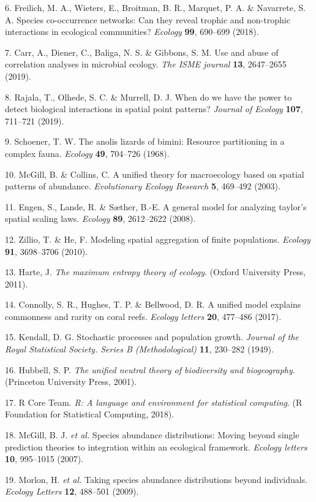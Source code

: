 \documentclass[]{article}
\begin{document}
\hypertarget{ref-freilich2018}{}
6. Freilich, M. A., Wieters, E., Broitman, B. R., Marquet, P. A. \&
Navarrete, S. A. Species co-occurrence networks: Can they reveal trophic
and non-trophic interactions in ecological communities? \emph{Ecology}
\textbf{99}, 690--699 (2018).

\hypertarget{ref-carr2019}{}
7. Carr, A., Diener, C., Baliga, N. S. \& Gibbons, S. M. Use and abuse
of correlation analyses in microbial ecology. \emph{The ISME journal}
\textbf{13}, 2647--2655 (2019).

\hypertarget{ref-rajala2019}{}
8. Rajala, T., Olhede, S. C. \& Murrell, D. J. When do we have the power
to detect biological interactions in spatial point patterns?
\emph{Journal of Ecology} \textbf{107}, 711--721 (2019).

\hypertarget{ref-schoener1968}{}
9. Schoener, T. W. The anolis lizards of bimini: Resource partitioning
in a complex fauna. \emph{Ecology} \textbf{49}, 704--726 (1968).

\hypertarget{ref-mcgill2003}{}
10. McGill, B. \& Collins, C. A unified theory for macroecology based on
spatial patterns of abundance. \emph{Evolutionary Ecology Research}
\textbf{5}, 469--492 (2003).

\hypertarget{ref-engen2008}{}
11. Engen, S., Lande, R. \& Sæther, B.-E. A general model for analyzing
taylor's spatial scaling laws. \emph{Ecology} \textbf{89}, 2612--2622
(2008).

\hypertarget{ref-zillio2010}{}
12. Zillio, T. \& He, F. Modeling spatial aggregation of finite
populations. \emph{Ecology} \textbf{91}, 3698--3706 (2010).

\hypertarget{ref-harte2011}{}
13. Harte, J. \emph{The maximum entropy theory of ecology}. (Oxford
University Press, 2011).

\hypertarget{ref-connolly2017}{}
14. Connolly, S. R., Hughes, T. P. \& Bellwood, D. R. A unified model
explains commonness and rarity on coral reefs. \emph{Ecology letters}
\textbf{20}, 477--486 (2017).

\hypertarget{ref-kendall1949}{}
15. Kendall, D. G. Stochastic processes and population growth.
\emph{Journal of the Royal Statistical Society. Series B
(Methodological)} \textbf{11}, 230--282 (1949).

\hypertarget{ref-hubbell2001}{}
16. Hubbell, S. P. \emph{The unified neutral theory of biodiversity and
biogeography}. (Princeton University Press, 2001).

\hypertarget{ref-rcore}{}
17. R Core Team. \emph{R: A language and environment for statistical
computing}. (R Foundation for Statistical Computing, 2018).

\hypertarget{ref-mcgill2007}{}
18. McGill, B. J. \emph{et al.} Species abundance distributions: Moving
beyond single prediction theories to integration within an ecological
framework. \emph{Ecology letters} \textbf{10}, 995--1015 (2007).

\hypertarget{ref-morlon2009}{}
19. Morlon, H. \emph{et al.} Taking species abundance distributions
beyond individuals. \emph{Ecology Letters} \textbf{12}, 488--501 (2009).
\end{document}
